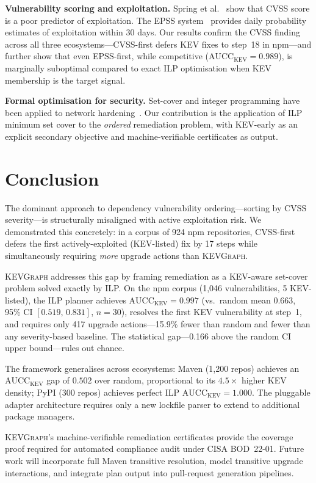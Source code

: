 \documentclass[conference]{IEEEtran}
\newcommand{\kevgraph}{\textsc{KEVGraph}\xspace}
\newcommand{\aucc}{$\mathrm{AUCC}_{\mathrm{KEV}}$\xspace}
\begin{document}
\textbf{Vulnerability scoring and exploitation.}
Spring et al.~\cite{spring21} show that CVSS score is a poor predictor
of exploitation.  The EPSS system~\cite{epss} provides daily
probability estimates of exploitation within 30 days.  Our results
confirm the CVSS finding across all three ecosystems---CVSS-first
defers KEV fixes to step~18 in npm---and further show that even
EPSS-first, while competitive (\aucc $= 0.989$), is marginally
suboptimal compared to exact ILP optimisation when KEV membership is
the target signal.

\textbf{Formal optimisation for security.}
Set-cover and integer programming have been applied to network
hardening~\cite{garey_johnson}.  Our contribution is the application of
ILP minimum set cover to the \emph{ordered} remediation problem, with
KEV-early as an explicit secondary objective and machine-verifiable
certificates as output.

\section{Conclusion}
\label{sec:conclusion}

The dominant approach to dependency vulnerability ordering---sorting by
CVSS severity---is structurally misaligned with active exploitation
risk.  We demonstrated this concretely: in a corpus of 924 npm
repositories, CVSS-first defers the first actively-exploited (KEV-listed)
fix by 17 steps while simultaneously requiring \emph{more} upgrade
actions than \kevgraph.

\kevgraph addresses this gap by framing remediation as a KEV-aware
set-cover problem solved exactly by ILP.  On the npm corpus (1,046
vulnerabilities, 5 KEV-listed), the ILP planner achieves
\aucc $= 0.997$ (vs.\ random mean $0.663$, 95\% CI $[0.519,\,0.831]$,
$n=30$), resolves the first KEV vulnerability at step~1, and requires
only 417 upgrade actions---15.9\% fewer than random and fewer than
any severity-based baseline.  The statistical gap---0.166 above the
random CI upper bound---rules out chance.

The framework generalises across ecosystems: Maven (1,200 repos)
achieves an \aucc gap of $0.502$ over random, proportional to its
$4.5\times$ higher KEV density; PyPI (300 repos) achieves perfect
ILP \aucc $= 1.000$.  The pluggable adapter architecture requires only
a new lockfile parser to extend to additional package managers.

\kevgraph's machine-verifiable remediation certificates provide
the coverage proof required for automated compliance audit under
CISA BOD~22-01.  Future work will incorporate full Maven transitive
resolution, model transitive upgrade interactions, and integrate
plan output into pull-request generation pipelines.
\end{document}

